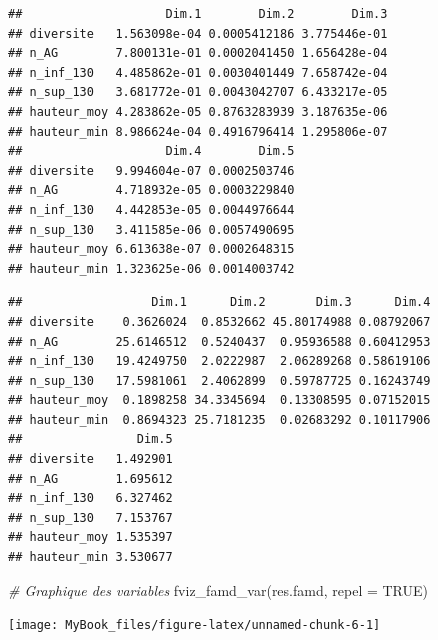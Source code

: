 \documentclass[
  12pt,
  american,
  a4paper,
  extrafontsizes,onecolumn,openright
  ]{memoir}
\newenvironment{Shaded}{\begin{snugshade}}{\end{snugshade}}
\newcommand{\AttributeTok}[1]{\textcolor[rgb]{0.77,0.63,0.00}{#1}}
\newcommand{\CommentTok}[1]{\textcolor[rgb]{0.56,0.35,0.01}{\textit{#1}}}
\newcommand{\ConstantTok}[1]{\textcolor[rgb]{0.00,0.00,0.00}{#1}}
\newcommand{\FunctionTok}[1]{\textcolor[rgb]{0.00,0.00,0.00}{#1}}
\newcommand{\NormalTok}[1]{#1}
\newcommand{\SpecialCharTok}[1]{\textcolor[rgb]{0.00,0.00,0.00}{#1}}
\begin{document}
\begin{verbatim}
##                    Dim.1        Dim.2        Dim.3
## diversite   1.563098e-04 0.0005412186 3.775446e-01
## n_AG        7.800131e-01 0.0002041450 1.656428e-04
## n_inf_130   4.485862e-01 0.0030401449 7.658742e-04
## n_sup_130   3.681772e-01 0.0043042707 6.433217e-05
## hauteur_moy 4.283862e-05 0.8763283939 3.187635e-06
## hauteur_min 8.986624e-04 0.4916796414 1.295806e-07
##                    Dim.4        Dim.5
## diversite   9.994604e-07 0.0002503746
## n_AG        4.718932e-05 0.0003229840
## n_inf_130   4.442853e-05 0.0044976644
## n_sup_130   3.411585e-06 0.0057490695
## hauteur_moy 6.613638e-07 0.0002648315
## hauteur_min 1.323625e-06 0.0014003742
\end{verbatim}

\begin{Shaded}
\end{Shaded}

\begin{verbatim}
##                  Dim.1      Dim.2       Dim.3      Dim.4
## diversite    0.3626024  0.8532662 45.80174988 0.08792067
## n_AG        25.6146512  0.5240437  0.95936588 0.60412953
## n_inf_130   19.4249750  2.0222987  2.06289268 0.58619106
## n_sup_130   17.5981061  2.4062899  0.59787725 0.16243749
## hauteur_moy  0.1898258 34.3345694  0.13308595 0.07152015
## hauteur_min  0.8694323 25.7181235  0.02683292 0.10117906
##                Dim.5
## diversite   1.492901
## n_AG        1.695612
## n_inf_130   6.327462
## n_sup_130   7.153767
## hauteur_moy 1.535397
## hauteur_min 3.530677
\end{verbatim}

\normalsize

\scriptsize

\begin{Shaded}
\begin{Highlighting}[]
\CommentTok{\# Graphique des variables}
\FunctionTok{fviz\_famd\_var}\NormalTok{(res.famd, }\AttributeTok{repel =} \ConstantTok{TRUE}\NormalTok{)}
\end{Highlighting}
\end{Shaded}

\begin{center}\texttt{[image: MyBook\_files/figure-latex/unnamed-chunk-6-1]} \end{center}
\end{document}
